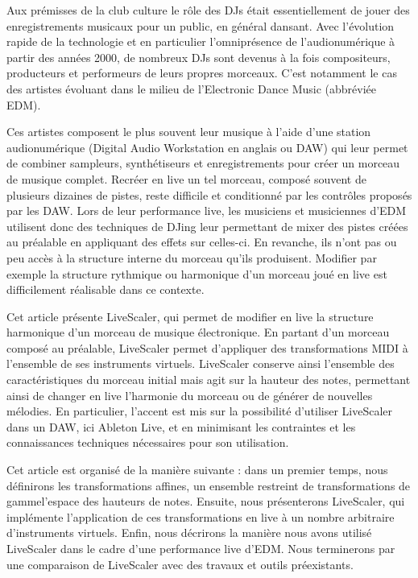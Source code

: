 Aux prémisses de la club culture le rôle des DJs était essentiellement de jouer des enregistrements musicaux pour un public, en général dansant. Avec l’évolution rapide de la technologie et en particulier l’omniprésence de l’audionumérique à partir des années 2000, de nombreux DJs sont devenus à la fois compositeurs, producteurs et performeurs de leurs propres morceaux. C'est notamment le cas des artistes évoluant dans le milieu de l'Electronic Dance Music (abbréviée EDM).

Ces artistes composent le plus souvent leur musique à l’aide d’une station audionumérique (Digital Audio Workstation en anglais ou DAW) qui leur permet de combiner sampleurs, synthétiseurs et enregistrements pour créer un morceau de musique complet. Recréer en live un tel morceau, composé souvent de plusieurs dizaines de pistes, reste difficile et conditionné par les contrôles proposés par les DAW. Lors de leur performance live, les musiciens et musiciennes d’EDM utilisent donc des techniques de DJing leur permettant de mixer des pistes créées au préalable en appliquant des effets sur celles-ci. En revanche, ils n’ont pas ou peu accès à la structure interne du morceau qu’ils produisent. Modifier par exemple la structure rythmique ou harmonique d’un morceau joué en live est difficilement réalisable dans ce contexte. 

Cet article présente LiveScaler, qui permet de modifier en live la structure harmonique d'un morceau de musique électronique. En partant d'un morceau composé au préalable, LiveScaler permet d'appliquer des transformations MIDI à l'ensemble de ses instruments virtuels. LiveScaler conserve ainsi l'ensemble des caractéristiques du morceau initial mais agit sur la hauteur des notes, permettant ainsi de changer en live l'harmonie du morceau ou de générer de nouvelles mélodies. En particulier, l'accent est mis sur la possibilité d'utiliser LiveScaler dans un DAW, ici Ableton Live, et en minimisant les contraintes et les connaissances techniques nécessaires pour son utilisation.

Cet article est organisé de la manière suivante : dans un premier temps, nous définirons les transformations affines, un ensemble restreint de transformations de gammel'espace des hauteurs de notes. Ensuite, nous présenterons Live\-Scaler, qui implémente l'application de ces transformations en live à un nombre arbitraire d'instruments virtuels. Enfin, nous décrirons la manière nous avons utilisé LiveScaler dans le cadre d'une performance live d'EDM. Nous terminerons par une comparaison de LiveScaler avec des travaux et outils préexistants.